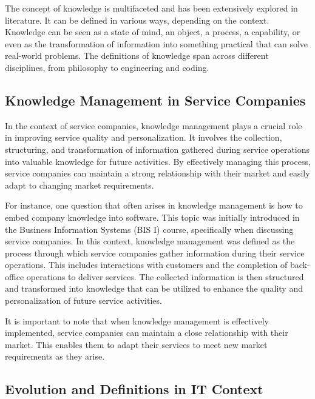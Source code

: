 The concept of knowledge is multifaceted and has been extensively
explored in literature. It can be defined in various ways, depending on
the context. Knowledge can be seen as a state of mind, an object, a
process, a capability, or even as the transformation of information into
something practical that can solve real-world problems. The definitions
of knowledge span across different disciplines, from philosophy to
engineering and coding.

\subsection{Knowledge Management in Service
    Companies}\label{knowledge-management-in-service-companies}

In the context of service companies, knowledge management plays a
crucial role in improving service quality and personalization. It
involves the collection, structuring, and transformation of information
gathered during service operations into valuable knowledge for future
activities. By effectively managing this process, service companies can
maintain a strong relationship with their market and easily adapt to
changing market requirements.

For instance, one question that often arises in knowledge management is
how to embed company knowledge into software. This topic was initially
introduced in the Business Information Systems (BIS I) course,
specifically when discussing service companies. In this context,
knowledge management was defined as the process through which service
companies gather information during their service operations. This
includes interactions with customers and the completion of back-office
operations to deliver services. The collected information is then
structured and transformed into knowledge that can be utilized to
enhance the quality and personalization of future service activities.

It is important to note that when knowledge management is effectively
implemented, service companies can maintain a close relationship with
their market. This enables them to adapt their services to meet new
market requirements as they arise.

\subsection{Evolution and Definitions in IT
    Context}\label{evolution-and-definitions-in-it-context}

